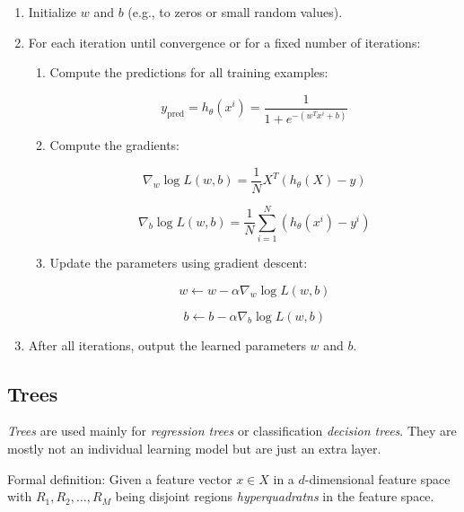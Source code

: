 \begin{enumerate}

    \item Initialize \(w\) and \(b\) (e.g., to zeros or small random values).

    \item For each iteration until convergence or for a fixed number of iterations:
    
        \begin{enumerate}
        
            \item Compute the predictions for all training examples:
        
                \[
                     y_{\text{pred}} = h_\theta(x^i) = \frac{1}{1 + e^{-(w^T x^i + b)}}
                \]
 
            \item Compute the gradients:

                \[
                    \nabla_w \log L(w,b) = \frac{1}{N} X^T (h_\theta(X) - y)
                \]

                \[
                    \nabla_b \log L(w,b) = \frac{1}{N} \sum_{i=1}^{N} (h_\theta(x^i) - y^i)
                \] 
        
            \item Update the parameters using gradient descent:
        
                \[
                    w \leftarrow w - \alpha \nabla_w \log L(w,b)
                \]
                
                \[
                    b \leftarrow b - \alpha \nabla_b \log L(w,b)
                \]

        \end{enumerate}

    \item After all iterations, output the learned parameters \(w\) and \(b\).

\end{enumerate}

\subsection{Trees}

\emph{Trees} are used mainly for \emph{regression trees} or classification \emph{decision trees}. They are 
mostly not an individual learning model but are just an extra layer.

Formal definition: Given a feature vector \(x \in X\) in a \(d\)-dimensional feature space with 
\(R_1, R_2, \dots, R_M\) being disjoint regions \emph{hyperquadratns} in the feature space. 

